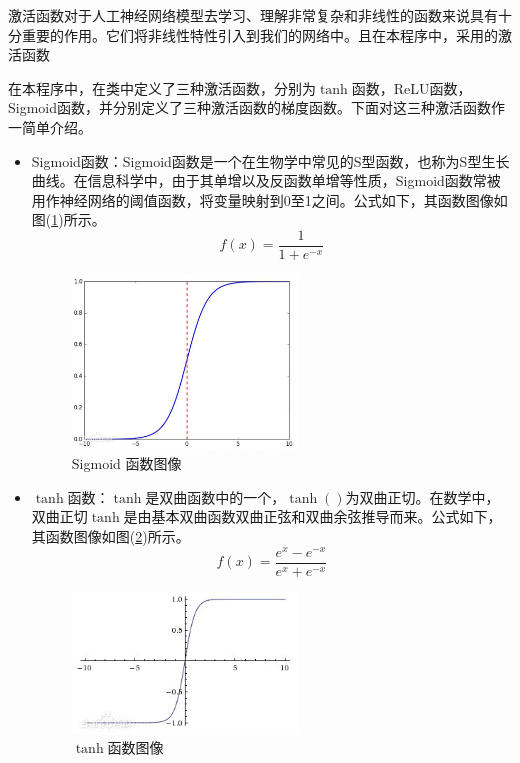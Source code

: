 \documentclass[UTF-8, a4paper, 12pt]{ctexart}
\begin{document}
激活函数对于人工神经网络模型去学习、理解非常复杂和非线性的函数来说具有十分重要的作用。它们将非线性特性引入到我们的网络中。且在本程序中，采用的激活函数

在本程序中，在类中定义了三种激活函数，分别为$\tanh$函数，ReLU函数，Sigmoid函数，并分别定义了三种激活函数的梯度函数。下面对这三种激活函数作一简单介绍。\begin{itemize}
    \item Sigmoid函数：Sigmoid函数是一个在生物学中常见的S型函数，也称为S型生长曲线。在信息科学中，由于其单增以及反函数单增等性质，Sigmoid函数常被用作神经网络的阈值函数，将变量映射到0至1之间。公式如下，其函数图像如图(\ref{sigmoid})所示。\begin{equation}
        f(x)=\frac{1}{1+e^{-x}}
    \end{equation}
    \begin{figure}[htbp]
        \centering
        \includegraphics[width=6cm]{fig/sigmoid.jpg}
        \caption{Sigmoid 函数图像}
        \label{sigmoid}
    \end{figure}
    \item $\tanh$函数：$\tanh$是双曲函数中的一个，$\tanh()$为双曲正切。在数学中，双曲正切$\tanh$是由基本双曲函数双曲正弦和双曲余弦推导而来。公式如下，其函数图像如图(\ref{tanh})所示。\begin{equation}
        f(x)=\frac{e^x-e^{-x}}{e^x+e^{-x}}
    \end{equation}
    \begin{figure}[htbp]
        \centering
        \includegraphics[width=6cm]{fig/tanh.jpg}
        \caption{$\tanh$函数图像}
        \label{tanh}
    \end{figure}


\end{itemize}
\end{document}
